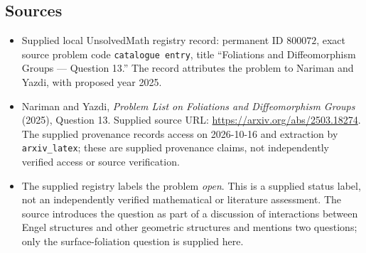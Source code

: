 \documentclass[11pt]{article}
\begin{document}
\subsection{Sources}
\begin{itemize}
\item Supplied local UnsolvedMath registry record: permanent ID \(800072\), exact source problem code \texttt{catalogue entry}, title ``Foliations and Diffeomorphism Groups --- Question 13.'' The record attributes the problem to Nariman and Yazdi, with proposed year 2025.
\item Nariman and Yazdi, \emph{Problem List on Foliations and Diffeomorphism Groups} (2025), Question 13. Supplied source URL: \url{https://arxiv.org/abs/2503.18274}. The supplied provenance records access on 2026-10-16 and extraction by \texttt{arxiv\_latex}; these are supplied provenance claims, not independently verified access or source verification.
\item The supplied registry labels the problem \emph{open}. This is a supplied status label, not an independently verified mathematical or literature assessment. The source introduces the question as part of a discussion of interactions between Engel structures and other geometric structures and mentions two questions; only the surface-foliation question is supplied here.
\end{itemize}
\end{document}
